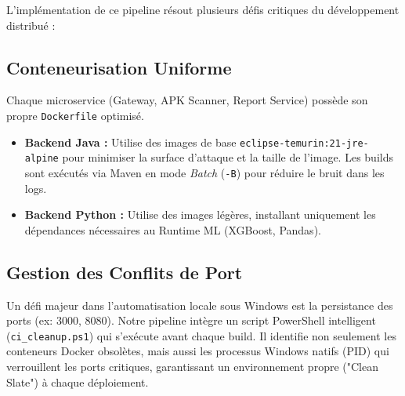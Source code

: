 \documentclass[
  journal=largetwo,
  manuscript=article-type,
  year=2025,
  volume=1,
]{cup-journal}
\begin{document}
\begin{strip}
\centering
\noindent{}
\vspace{1em}
\end{strip}

L'implémentation de ce pipeline résout plusieurs défis critiques du développement distribué :

\subsection{Conteneurisation Uniforme}
Chaque microservice (Gateway, APK Scanner, Report Service) possède son propre \texttt{Dockerfile} optimisé.
\begin{itemize}
    \item \textbf{Backend Java :} Utilise des images de base \texttt{eclipse-temurin:21-jre-alpine} pour minimiser la surface d'attaque et la taille de l'image. Les builds sont exécutés via Maven en mode \textit{Batch} (\texttt{-B}) pour réduire le bruit dans les logs.
    \item \textbf{Backend Python :} Utilise des images légères, installant uniquement les dépendances nécessaires au Runtime ML (XGBoost, Pandas).
\end{itemize}

\subsection{Gestion des Conflits de Port}
Un défi majeur dans l'automatisation locale sous Windows est la persistance des ports (ex: 3000, 8080). Notre pipeline intègre un script PowerShell intelligent (\texttt{ci\_cleanup.ps1}) qui s'exécute avant chaque build. Il identifie non seulement les conteneurs Docker obsolètes, mais aussi les processus Windows natifs (PID) qui verrouillent les ports critiques, garantissant un environnement propre ("Clean Slate") à chaque déploiement.
\end{document}

